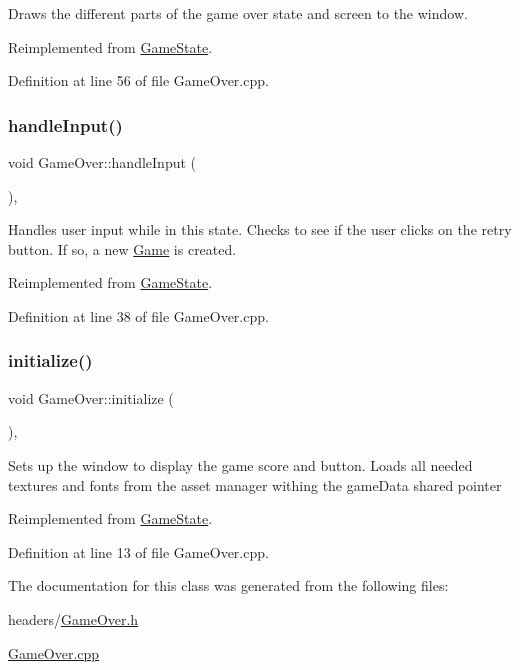 Draws the different parts of the game over state and screen to the window. 

Reimplemented from \mbox{\hyperlink{class_game_state_adf753ecc90e0b309c849b117036e619e}{Game\+State}}.



Definition at line 56 of file Game\+Over.\+cpp.

\mbox{\label{class_game_over_ad503a45f38d4472d3a91c096390c4aea}} 
\subsubsection{\texorpdfstring{handleInput()}{handleInput()}}
{\footnotesize\ttfamily void Game\+Over\+::handle\+Input (\begin{DoxyParamCaption}{ }\end{DoxyParamCaption})\hspace{0.3cm}{\ttfamily [override]}, {\ttfamily [virtual]}}

Handles user input while in this state. Checks to see if the user clicks on the retry button. If so, a new \mbox{\hyperlink{class_game}{Game}} is created. 

Reimplemented from \mbox{\hyperlink{class_game_state_a734dd3521eb3056ee7d3f3e7c982b5a9}{Game\+State}}.



Definition at line 38 of file Game\+Over.\+cpp.

\mbox{\label{class_game_over_a973dbbd0bfc74c540b933853202b46a4}} 
\subsubsection{\texorpdfstring{initialize()}{initialize()}}
{\footnotesize\ttfamily void Game\+Over\+::initialize (\begin{DoxyParamCaption}{ }\end{DoxyParamCaption})\hspace{0.3cm}{\ttfamily [override]}, {\ttfamily [virtual]}}

Sets up the window to display the game score and button. Loads all needed textures and fonts from the asset manager withing the game\+Data shared pointer 

Reimplemented from \mbox{\hyperlink{class_game_state_a22d3404f53895a23359557a713194736}{Game\+State}}.



Definition at line 13 of file Game\+Over.\+cpp.



The documentation for this class was generated from the following files\+:\begin{DoxyCompactItemize}
\item 
headers/\mbox{\hyperlink{_game_over_8h}{Game\+Over.\+h}}\item 
\mbox{\hyperlink{_game_over_8cpp}{Game\+Over.\+cpp}}\end{DoxyCompactItemize}
